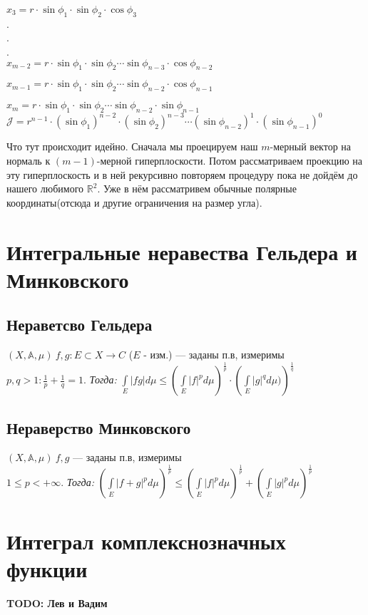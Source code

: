 \documentclass[paper=a4, fontsize=17pt]{article}
\begin{document}
	$x_3 = r \cdot \sin \phi_1 \cdot \sin \phi_2 \cdot \cos \phi_3$\\
	.\\
	.\\
	.\\
	$x_{m-2} = r \cdot \sin \phi_1 \cdot \sin \phi_2 \cdots \sin \phi_{n-3} \cdot \cos \phi_{n-2}$
	
	$x_{m-1} = r \cdot \sin \phi_1 \cdot \sin \phi_2 \cdots \sin \phi_{n-2} \cdot \cos \phi_{n-1}$
	
	
	$x_{m} = r \cdot \sin \phi_1 \cdot \sin \phi_2 \cdots \sin \phi_{n-2} \cdot \sin \phi_{n-1}$\\
	
	$\mathcal{J} = r^{n-1} \cdot (\sin \phi_1)^{n-2} \cdot (\sin \phi_2)^{n-3} \cdots (\sin \phi_{n-2})^{1} \cdot (\sin \phi_{n-1})^{0}$
	
	Что тут происходит идейно. Сначала мы проецируем наш $m$-мерный вектор на нормаль к $(m-1)$-мерной гиперплоскости. Потом рассматриваем проекцию на эту гиперплоскость и в ней рекурсивно повторяем процедуру пока не дойдём до нашего любимого $\mathbb{R}^2$. Уже в нём рассматривем обычные полярные координаты(отсюда и другие ограничения на размер угла).
	
	\section{Интегральные неравества Гельдера и Минковского}
	\subsection{Нераветсво Гельдера}
	$(X, \mathds{A}, \mu)\ f, g : E \subset X \rightarrow C$ ($E$ - изм.) --- заданы п.в, измеримы\\
	$p, q > 1 : \frac{1}{p} + \frac{1}{q} = 1$. 
	\emph{Тогда:}
	${\displaystyle \int\limits_E |fg|d\mu \leq \left(\int\limits_E |f|^p d\mu\right)^\frac{1}{p} \cdot \left(\int\limits_E |g|^q d\mu)\right)^\frac{1}{q}}$
	\subsection{Нераверство Минковского}
	$(X, \mathds{A}, \mu)\ f, g $ --- заданы п.в, измеримы\\
	$1 \leq p < +\infty$. 
	\emph{Тогда:}
	${\displaystyle \left(\int\limits_E |f + g|^p d\mu \right)^\frac{1}{p} 
		\leq \left(\int\limits_E |f|^p d\mu\right)^\frac{1}{p} 
		+ \left(\int\limits_E |g|^p d\mu\right)^\frac{1}{p}}$
	
	\section{Интеграл комплекснозначных функции}
	\textbf{TODO: Лев и Вадим}
	
\end{document}
